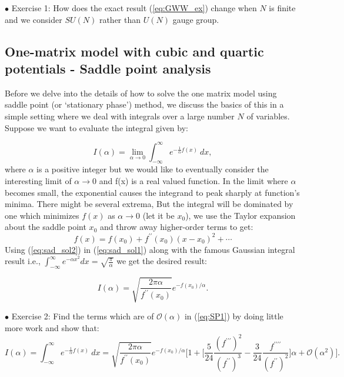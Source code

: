 \documentclass[11pt]{article}
\begin{document}
\begin{mdframed}[backgroundcolor=blue!3] 
	\textsc{} 
	$\bullet$ Exercise 1:  How does the exact result (\ref{eq:GWW_ex}) change when 
	$N$ is finite and we consider $SU(N)$ rather than $U(N)$ gauge group. \\ 
\end{mdframed} 

\subsection{One-matrix model with cubic and quartic potentials - Saddle point analysis}
Before we delve into the details of how to solve the one matrix model using saddle point (or `stationary phase') method, we discuss the basics of this in a simple setting where we deal with integrals over a large number $N$ of variables. Suppose we want to evaluate the integral given by:

\begin{equation}
\label{eq:SP1} 
I(\alpha) = \lim_{\alpha \to 0} \int_{-\infty}^{\infty} e^{-\frac{1}{\alpha}f(x)} ~dx, 
\end{equation}
where $\alpha$ is a positive integer but we would like to eventually consider the interesting limit 
of $\alpha \to 0$ and f(x) is a real valued function. In the limit where $\alpha$ becomes small, 
the exponential causes the integrand to peak sharply at function's minima. There might be several extrema,
But the integral will be dominated by one which minimizes $f(x)$ as $\alpha \to 0$ (let it be $x_{0}$), 
we use the Taylor expansion about the saddle point $x_{0}$ and throw away higher-order terms to get:
\begin{equation}
	\label{eq:sad_sol2}
	f(x) = f(x_{0}) + f^{\prime\prime}(x_{0}) (x-x_0)^{2} + \cdots 
\end{equation}
Using (\ref{eq:sad_sol2}) in (\ref{eq:sad_sol1}) along with the famous Gaussian integral result i.e.,  $\int_{-\infty}^{\infty} e^{-\alpha x^2} dx = \sqrt{\frac{\pi}{\alpha}}$ we get the desired result:

\begin{equation}
	\label{eq:sad_sol1} 
	I(\alpha) =  \sqrt{\frac{2\pi \alpha}{f^{\prime\prime}(x_{0})}} e^{-f(x_{0})/\alpha}. 
\end{equation}



\begin{mdframed}[backgroundcolor=blue!3] 
	\textsc{} 
	$\bullet$ Exercise 2: Find the terms which are of $\mathcal{O}(\alpha)$ in (\ref{eq:SP1}) by doing little more work and show that:
	\begin{equation*}
	I(\alpha) = \int_{-\infty}^{\infty} e^{-\frac{1}{\alpha}f(x)} ~dx = \sqrt{\frac{2\pi \alpha}{f^{\prime\prime}(x_{0})}} e^{-f(x_{0})/\alpha} \Bigg[1 + 
	\Big[ \frac{5}{24} \frac{(f^{\prime\prime\prime})^2}{(f^{\prime\prime})^3} - \frac{3}{24} \frac{f^{\prime\prime\prime\prime}}{(f^{\prime\prime})^2}\Big] \alpha + \mathcal{O}(\alpha^{2})\Bigg]. 
	\end{equation*}	
\end{mdframed} 
\end{document}
